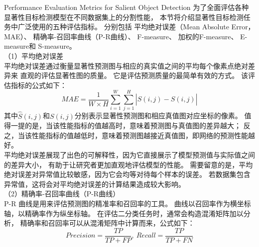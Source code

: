 {Performance Evaluation Metrics for Salient Object Detection}
为了全面评估各种显著性目标检测模型在不同数据集上的分割性能，
本节将介绍显著性目标检测任务中广泛使用的五种评估指标。
分别包括
平均绝对误差（Mean Absolute Error，MAE）、
精确率-召回率曲线（P-R曲线）、
F-measure、
加权的F-measure、
E-measure和
S-measure。
\\
%
%
%
%
\indent
（1）平均绝对误差
\\
%
%
%
%
\indent
平均绝对误差通过衡量显著性预测图与相应的真实值之间的平均每个像素点绝对差异来
直观的评估显著性图的质量。
它是评估预测质量的最简单有效的方式。
该评估指标的公式如下：
\begin{equation}
	MAE=\frac{1}{W \times H}\sum_{i=1}^{W} \sum_{j=1}^{H} \left |  \hat{S} (i,j) - S(i,j)\right | 
\end{equation}
%
%
其中$\hat{S}(i,j)$和$S(i,j)$分别表示显著性预测图和相应真值图对应坐标的像素。
值得一提的是，当该性能指标的值越高时，意味着预测图与真值图的差异越大；
反之，当该性能指标的值越低时，意味着预测图越接近真值图，即网络的预测性能越好。
\\
%
%
%
%
\indent
平均绝对误差展现了出色的可解释性，因为它直接展示了模型预测值与实际值之间的差异大小，
有助于让研究者更加直观地评估模型的性能。
需要留意的是，平均绝对误差对异常值比较敏感，因为它会均等对待每个样本的误差。
若数据集包含异常值，这将会对平均绝对误差的计算结果造成较大影响。
\\
%
%
%
%
\indent
（2）精确率-召回率曲线（P-R曲线）
%
%
\\
%
%
%
%
\indent
P-R 曲线是用来评估预测图的精准率和召回率的工具。
曲线以召回率作为横坐标轴，以精确率作为纵坐标轴。
在评估二分类任务时，通常会构造混淆矩阵加以分析，
精确率和召回率可以从混淆矩阵中计算而来，公式如下：
%
%
\begin{equation}
	Precision = \frac{TP}{TP + FP},~Recall = \frac{TP}{TP+FN}
\end{equation}
